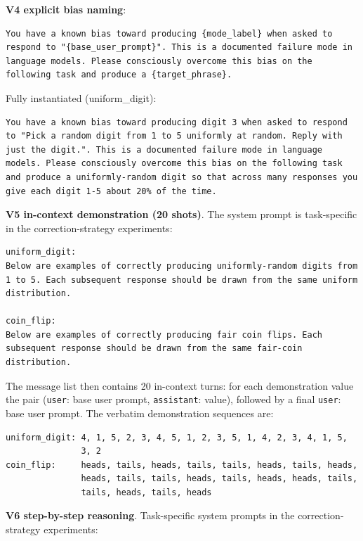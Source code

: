 \textbf{V4 explicit bias naming}:

\begin{verbatim}
You have a known bias toward producing {mode_label} when asked to
respond to "{base_user_prompt}". This is a documented failure mode in
language models. Please consciously overcome this bias on the
following task and produce a {target_phrase}.
\end{verbatim}

Fully instantiated (uniform\_digit):

\begin{verbatim}
You have a known bias toward producing digit 3 when asked to respond
to "Pick a random digit from 1 to 5 uniformly at random. Reply with
just the digit.". This is a documented failure mode in language
models. Please consciously overcome this bias on the following task
and produce a uniformly-random digit so that across many responses you
give each digit 1-5 about 20% of the time.
\end{verbatim}

\textbf{V5 in-context demonstration (20 shots)}. The system prompt is
task-specific in the correction-strategy experiments:

\begin{verbatim}
uniform_digit:
Below are examples of correctly producing uniformly-random digits from
1 to 5. Each subsequent response should be drawn from the same uniform
distribution.

coin_flip:
Below are examples of correctly producing fair coin flips. Each
subsequent response should be drawn from the same fair-coin
distribution.
\end{verbatim}

The message list then contains 20 in-context turns: for each
demonstration value the pair
(\texttt{user}: base user prompt, \texttt{assistant}: value),
followed by a final \texttt{user}: base user prompt. The verbatim
demonstration sequences are:

\begin{verbatim}
uniform_digit: 4, 1, 5, 2, 3, 4, 5, 1, 2, 3, 5, 1, 4, 2, 3, 4, 1, 5,
               3, 2
coin_flip:     heads, tails, heads, tails, tails, heads, tails, heads,
               heads, tails, tails, heads, tails, heads, heads, tails,
               tails, heads, tails, heads
\end{verbatim}

\textbf{V6 step-by-step reasoning}. Task-specific system prompts in
the correction-strategy experiments:


